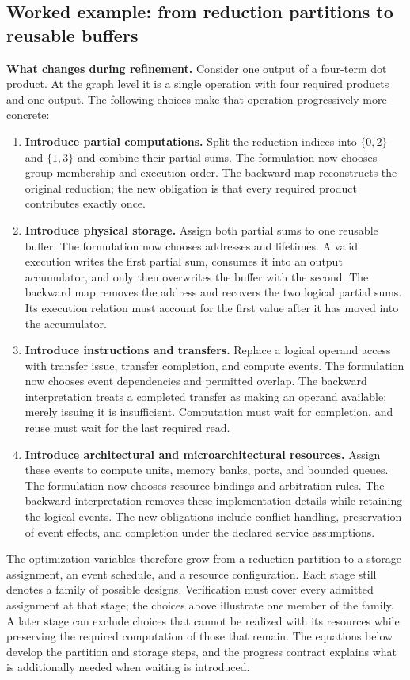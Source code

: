 \documentclass[11pt]{article}
\begin{document}
\subsection{Worked example: from reduction partitions to reusable buffers}\label{sec:example}
\textbf{What changes during refinement.}
Consider one output of a four-term dot product. At the graph level it is a single operation with four required products and one output. The following choices make that operation progressively more concrete:
\begin{enumerate}
\item \textbf{Introduce partial computations.} Split the reduction indices into $\{0,2\}$ and $\{1,3\}$ and combine their partial sums. The formulation now chooses group membership and execution order. The backward map reconstructs the original reduction; the new obligation is that every required product contributes exactly once.
\item \textbf{Introduce physical storage.} Assign both partial sums to one reusable buffer. The formulation now chooses addresses and lifetimes. A valid execution writes the first partial sum, consumes it into an output accumulator, and only then overwrites the buffer with the second. The backward map removes the address and recovers the two logical partial sums. Its execution relation must account for the first value after it has moved into the accumulator.
\item \textbf{Introduce instructions and transfers.} Replace a logical operand access with transfer issue, transfer completion, and compute events. The formulation now chooses event dependencies and permitted overlap. The backward interpretation treats a completed transfer as making an operand available; merely issuing it is insufficient. Computation must wait for completion, and reuse must wait for the last required read.
\item \textbf{Introduce architectural and microarchitectural resources.} Assign these events to compute units, memory banks, ports, and bounded queues. The formulation now chooses resource bindings and arbitration rules. The backward interpretation removes these implementation details while retaining the logical events. The new obligations include conflict handling, preservation of event effects, and completion under the declared service assumptions.
\end{enumerate}
The optimization variables therefore grow from a reduction partition to a storage assignment, an event schedule, and a resource configuration. Each stage still denotes a family of possible designs. Verification must cover every admitted assignment at that stage; the choices above illustrate one member of the family. A later stage can exclude choices that cannot be realized with its resources while preserving the required computation of those that remain. The equations below develop the partition and storage steps, and the progress contract explains what is additionally needed when waiting is introduced.
\end{document}
